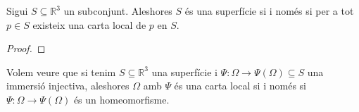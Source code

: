 \documentclass[../Apunts.tex]{subfiles}
\begin{document}
	\begin{theorem}
		\label{thm:ser superfície és equivalent a tenir cartes locals}
		Sigui \(S\subseteq\mathbb{R}^{3}\) un subconjunt. Aleshores \(S\) és una superfície si i només si per a tot \(p\in S\) existeix una carta local de \(p\) en \(S\).
	\end{theorem}
	\begin{proof}
	\end{proof}
	\begin{example}
		Volem veure que si tenim \(S\subseteq\mathbb{R}^{3}\) una superfície i \(\Psi\colon\Omega\longrightarrow\Psi(\Omega)\subseteq S\) una immersió injectiva, aleshores \(\Omega\) amb \(\Psi\) és una carta local si i només si \(\Psi\colon\Omega\longrightarrow\Psi(\Omega)\) és un homeomorfisme.
	\end{example}
	\begin{solution}
	\end{solution}
\end{document}
